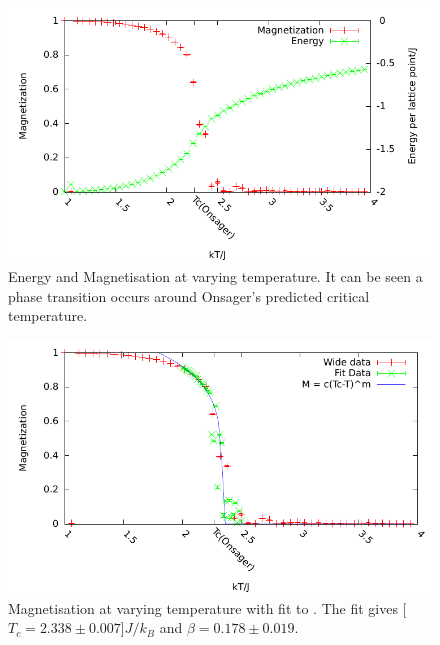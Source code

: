 \documentclass[12pt,a4paper,english]{article}
\begin{document}
\begin{figure}
\center
\includegraphics[width=\textwidth]{Optimized/tests/ising.pdf}
\caption{Energy and Magnetisation at varying temperature. It can be seen a phase transition occurs around Onsager's predicted critical temperature.}\label{fig:ising}
\end{figure}

\begin{figure}
\center
\includegraphics[width=\textwidth]{Optimized/tests/detail.pdf}
\caption{Magnetisation at varying temperature with fit to . The fit gives \unit[$T_c=2.338\pm0.007$]{$J/k_B$} and $\beta=0.178\pm0.019$.}\label{fig:detail}
\end{figure}
\end{document}
